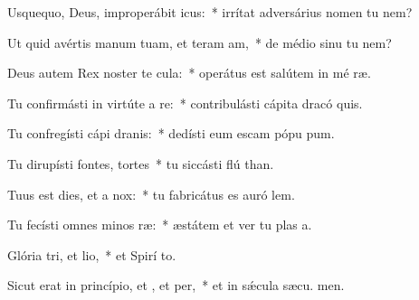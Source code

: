 \item Usquequo, Deus, improperábit icus:~* irrítat adversárius nomen tu  nem?
\item Ut quid avértis manum tuam, et teram am,~* de médio sinu tu  nem?
\item Deus autem Rex noster te cula:~* operátus est salútem in mé ræ.
\item Tu confirmásti in virtúte a re:~* contribulásti cápita dracó  quis.
\item Tu confregísti cápi dranis:~* dedísti eum escam pópu pum.
\item Tu dirupísti fontes,  tortes~* tu siccásti flú than.
\item Tuus est dies, et a  nox:~* tu fabricátus es auró  lem.
\item Tu fecísti omnes minos ræ:~* æstátem et ver tu plas a.
\item Glória tri, et lio,~* et Spirí to.
\item Sicut erat in princípio, et , et per,~* et in sǽcula sæcu. men.
